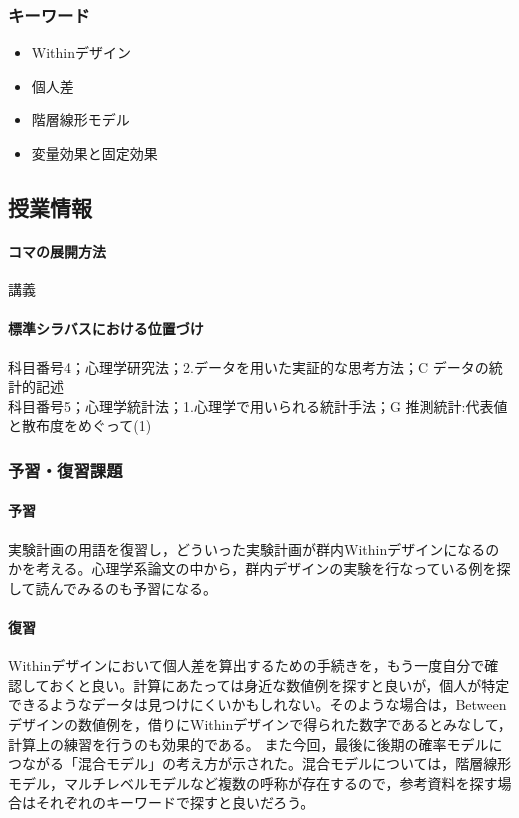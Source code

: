 \subsubsection{キーワード}
\begin{itemize}
	\item Withinデザイン
	\item 個人差
	\item 階層線形モデル
	\item 変量効果と固定効果
\end{itemize}
\subsection{授業情報}
\paragraph{コマの展開方法}
講義
\paragraph{標準シラバスにおける位置づけ}
科目番号4；心理学研究法；2.データを用いた実証的な思考方法；C データの統計的記述\\
科目番号5；心理学統計法；1.心理学で用いられる統計手法；G 推測統計:代表値と散布度をめぐって(1)
\subsubsection{予習・復習課題}
\paragraph{予習}
実験計画の用語を復習し，どういった実験計画が群内Withinデザインになるのかを考える。心理学系論文の中から，群内デザインの実験を行なっている例を探して読んでみるのも予習になる。
\paragraph{復習}
Withinデザインにおいて個人差を算出するための手続きを，もう一度自分で確認しておくと良い。計算にあたっては身近な数値例を探すと良いが，個人が特定できるようなデータは見つけにくいかもしれない。そのような場合は，Betweenデザインの数値例を，借りにWithinデザインで得られた数字であるとみなして，計算上の練習を行うのも効果的である。
また今回，最後に後期の確率モデルにつながる「混合モデル」の考え方が示された。混合モデルについては，階層線形モデル，マルチレベルモデルなど複数の呼称が存在するので，参考資料を探す場合はそれぞれのキーワードで探すと良いだろう。